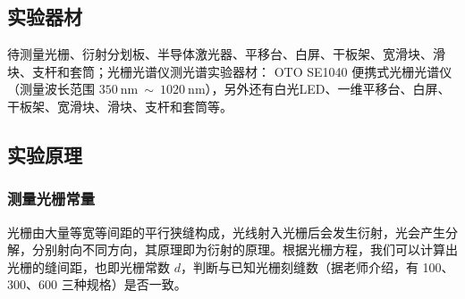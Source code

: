 \documentclass[UTF8]{article}
\theoremstyle{MyLineTheoremStyle} %
\theoremstyle{MyBlockTheoremStyle} %
\theoremstyle{MySubsubsectionStyle} %
\begin{document}
\subsection{实验器材}

待测量光栅、衍射分划板、半导体激光器、平移台、白屏、干板架、宽滑块、滑块、支杆和套筒；光栅光谱仪测光谱实验器材： OTO SE1040 便携式光栅光谱仪（测量波长范围 $350 \ \mathrm{nm} \ \sim \ 1020 \ \mathrm{nm}$），另外还有白光LED、一维平移台、白屏、干板架、宽滑块、滑块、支杆和套筒等。

\subsection{实验原理}

\subsubsection{测量光栅常量}

光栅由大量等宽等间距的平行狭缝构成，光线射入光栅后会发生衍射，光会产生分解，分别射向不同方向，其原理即为衍射的原理。根据光栅方程，我们可以计算出光栅的缝间距，也即光栅常数 $d$，判断与已知光栅刻缝数（据老师介绍，有 100、300、600 三种规格）是否一致。
\end{document}
